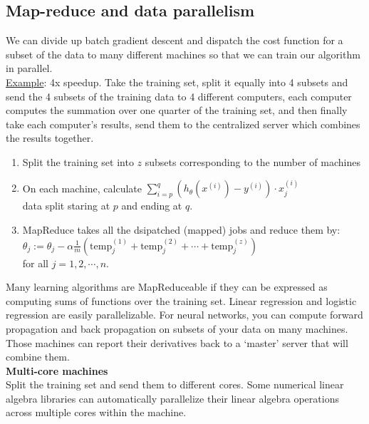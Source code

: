 \subsection{Map-reduce and data parallelism}
We can divide up batch gradient descent and dispatch the cost function for a subset of the data to many different machines so that we can train our algorithm in parallel.\\
\underline{Example}: 4x speedup. Take the training set, split it equally into 4 subsets and send the 4 subsets of the training data to 4 different computers, each computer computes the summation over one quarter of the training set, and then finally take each computer's results, send them to the centralized server which combines the results together.\\

\begin{enumerate}
\item
Split the training set into $z$ subsets corresponding to the number of machines
\item
On each machine, calculate $\sum_{i=p}^{q}(h_{\theta}(x^{(i)}) - y^{(i)})\cdot x_j^{(i)}$\\
data split staring at $p$ and ending at $q$.
\item
MapReduce takes all the dsipatched (mapped) jobs and reduce them by:\\
$\theta_j := \theta_j - \alpha \frac{1}{m}(\text{temp}_j^{(1)} + \text{temp}_j^{(2)} + \cdots + \text{temp}_j^{(z)})$\\
for all $j = 1, 2, \cdots, n$.
\end{enumerate}

Many learning algorithms are MapReduceable if they can be expressed as computing sums of functions over the training set. Linear regression and logistic regression are easily parallelizable. For neural networks, you can compute forward propagation and back propagation on subsets of your data on many machines. Those machines can report their derivatives back to a `master' server that will combine them.\\

\textbf{Multi-core machines}\\
Split the training set and send them to different cores. Some numerical linear algebra libraries can automatically parallelize their linear algebra operations across multiple cores within the machine.


